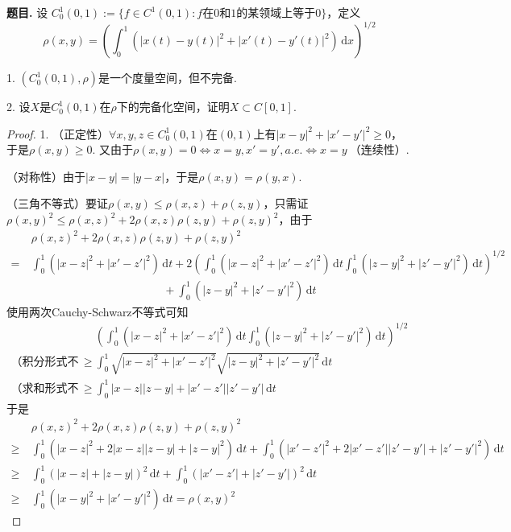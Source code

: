 \documentclass[12pt, a4paper, oneside]{ctexart}
\newcounter{problem}  %
\newenvironment{problem}{\stepcounter{problem}\par\noindent\textbf{题目\arabic{problem}. }}{\smallskip\par}
\let\leq=\leqslant %
\let\geq=\geqslant %
\def\d{\mathrm{d}}          %
\begin{document}
\begin{problem}
    设 $C_0^1(0, 1):=\{f\in C^1(0, 1): f\text{在}0\text{和}1\text{的某领域上等于}0\}$，定义
    \begin{equation*}
        \rho(x, y) = \left(\int_0^1(|x(t)-y(t)|^2+|x'(t)-y'(t)|^2)\,\d x\right)^{1/2}
    \end{equation*}

    1. $(C_0^1(0, 1), \rho)$是一个度量空间，但不完备.
    
    2. 设$X$是$C_0^1(0,1)$在$\rho$下的完备化空间，证明$X\subset C[0,1]$.
\end{problem}
\begin{proof}
    1. （正定性）$\forall x, y, z\in C_0^1(0, 1)$在$(0,1)$上有$|x-y|^2+|x'-y'|^2\geq 0$，于是$\rho(x, y)\geq 0$. 又由于$\rho(x, y) = 0\iff x=y, x'=y', a.e.\iff x=y\ \text{（连续性）}$.
    
    （对称性）由于$|x-y| = |y-x|$，于是$\rho(x, y) = \rho(y, x)$.

    （三角不等式）要证$\rho(x, y)\leq \rho(x, z)+\rho(z, y)$，只需证$\rho(x,y)^2\leq \rho(x, z)^2+2\rho(x,z)\rho(z,y)+\rho(z,y)^2$，由于
    \begin{align*}
        &\ \rho(x,z)^2+2\rho(x,z)\rho(z,y)+\rho(z,y)^2\\
        = &\ \int_0^1(|x-z|^2+|x'-z'|^2)\,\d t+2\left(\int_0^1(|x-z|^2+|x'-z'|^2)\,\d t\int_0^1(|z-y|^2+|z'-y'|^2)\,\d t\right)^{1/2}\\
        &\hspace{5cm}+\int_0^1(|z-y|^2+|z'-y'|^2)\,\d t
    \end{align*}
    使用两次Cauchy-Schwarz不等式可知
    \begin{align*}
        &\ \left(\int_0^1(|x-z|^2+|x'-z'|^2)\,\d t\int_0^1(|z-y|^2+|z'-y'|^2)\,\d t\right)^{1/2}\\
        \text{（积分形式不等式）}\geq&\ \int_0^1\sqrt{|x-z|^2+|x'-z'|^2}\sqrt{|z-y|^2+|z'-y'|^2}\,\d t\\
        \text{（求和形式不等式）}\geq&\ \int_0^1|x-z||z-y|+|x'-z'||z'-y'|\,\d t
    \end{align*}
    于是
    \begin{align*}
        &\ \rho(x, z)^2+2\rho(x,z)\rho(z,y)+\rho(z,y)^2\\
        \geq&\ \int_0^1(|x-z|^2+2|x-z||z-y|+|z-y|^2)\,\d t+\int_0^1(|x'-z'|^2+2|x'-z'||z'-y'|+|z'-y'|^2)\,\d t\\
        \geq&\ \int_0^1(|x-z|+|z-y|)^2\,\d t+\int_0^1(|x'-z'|+|z'-y'|)^2\,\d t\\
        \geq&\ \int_0^1(|x-y|^2+|x'-y'|^2)\,\d  t = \rho(x, y)^2
    \end{align*}
\end{proof}
\end{document}
